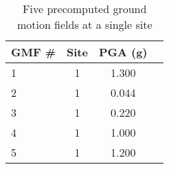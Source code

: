 \begin{table}[htbp]

\centering
\begin{tabular}{ l c c l }

\hline
\rowcolor{anti-flashwhite}
\bf{GMF \#} & \bf{Site} & \bf{PGA (g)}\\
\hline
1 & 1 & 1.300 \\
2 & 1 & 0.044 \\
3 & 1 & 0.220 \\
4 & 1 & 1.000 \\
5 & 1 & 1.200 \\
\hline
\end{tabular}

\caption{Five precomputed ground motion fields at a single site}
\label{tab:gmfs-diff-l1-5b}
\end{table}